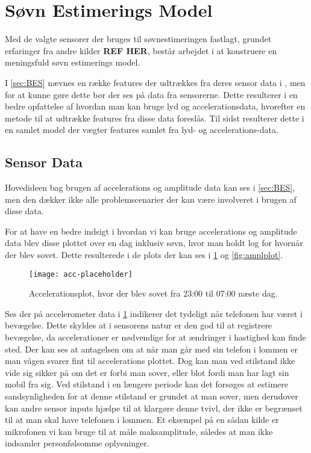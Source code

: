 \section{Søvn Estimerings Model}
Med de valgte sensorer der bruges til søvnestimeringen fastlagt, grundet erfaringer fra andre kilder \textbf{REF HER}, består arbejdet i at konstruere en meningsfuld søvn estimerings model.

I \cref{sec:BES} nævnes en række features der udtrækkes fra deres sensor data i \citet{6563918}, men for at kunne gøre dette bør der ses på data fra sensorerne.
Dette resulterer i en bedre opfattelse af hvordan man kan bruge lyd og accelerationsdata, hvorefter en metode til at udtrække features fra disse data foreslås.
Til sidst resulterer dette i en samlet model der vægter features samlet fra lyd- og accelerations-data.

\subsection{Sensor Data}
Hovedideen bag brugen af accelerations og amplitude data kan ses i \cref{sec:BES}, men den dækker ikke alle problemscenarier der kan være involveret i brugen af disse data.

For at have en bedre indsigt i hvordan vi kan bruge accelerations og amplitude data blev disse plottet over en dag inklusiv søvn, hvor man holdt log for hvornår der blev sovet.
Dette resulterede i de plots der kan ses i \cref{fig:accplot} og \cref{fig:amplplot}.

\begin{figure}[h]
	\centering
	\texttt{[image: acc-placeholder]}
	\caption{Accelerationsplot, hvor der blev sovet fra 23:00 til 07:00 næste dag.}\label{fig:accplot}
\end{figure}

Ses der på accelerometer data i \cref{fig:accplot} indikerer det tydeligt når telefonen har været i bevægelse.
Dette skyldes at i sensorens natur er den god til at registrere bevægelse, da accelerationer er nødvendige for at ændringer i hastighed kan finde sted.
Der kan ses at antagelsen om at når man går med sin telefon i lommen er man vågen svarer fint til accelerations plottet.
Dog kan man ved stilstand ikke vide sig sikker på om det er forbi man sover, eller blot fordi man har lagt sin mobil fra sig.
Ved stilstand i en længere periode kan det forsøges at estimere sandsynligheden for at denne stilstand er grundet at man sover, men derudover kan andre sensor inputs hjælpe til at klargøre denne tvivl, der ikke er begrænset til at man skal have telefonen i lommen.
Et eksempel på en sådan kilde er mikrofonen vi kan bruge til at måle maksamplitude, således at man ikke indsamler personfølsomme oplysninger.

